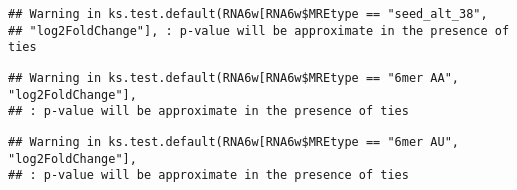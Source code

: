 \documentclass[
]{article}
\newenvironment{Shaded}{\begin{snugshade}}{\end{snugshade}}
\newcommand{\FunctionTok}[1]{\textcolor[rgb]{0.13,0.29,0.53}{\textbf{#1}}}
\newcommand{\NormalTok}[1]{#1}
\newcommand{\OtherTok}[1]{\textcolor[rgb]{0.56,0.35,0.01}{#1}}
\newcommand{\SpecialCharTok}[1]{\textcolor[rgb]{0.81,0.36,0.00}{\textbf{#1}}}
\newcommand{\StringTok}[1]{\textcolor[rgb]{0.31,0.60,0.02}{#1}}
\begin{document}
\begin{verbatim}
## Warning in ks.test.default(RNA6w[RNA6w$MREtype == "seed_alt_38",
## "log2FoldChange"], : p-value will be approximate in the presence of ties
\end{verbatim}

\begin{Shaded}
\end{Shaded}

\begin{verbatim}
## Warning in ks.test.default(RNA6w[RNA6w$MREtype == "6mer AA", "log2FoldChange"],
## : p-value will be approximate in the presence of ties
\end{verbatim}

\begin{Shaded}
\end{Shaded}

\begin{verbatim}
## Warning in ks.test.default(RNA6w[RNA6w$MREtype == "6mer AU", "log2FoldChange"],
## : p-value will be approximate in the presence of ties
\end{verbatim}

\begin{Shaded}
\end{Shaded}
\end{document}
